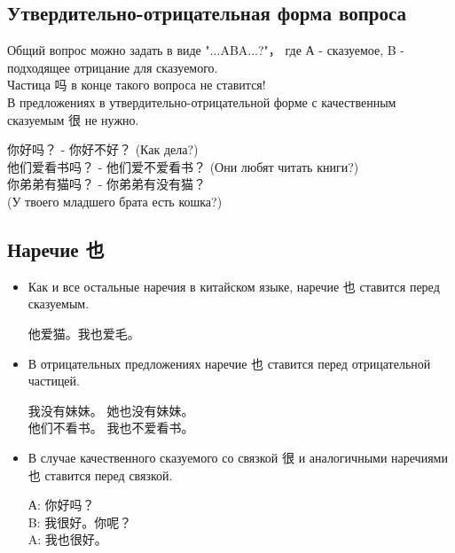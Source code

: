 \subsection{Утвердительно-отрицательная форма вопроса}
Общий вопрос можно задать в виде "...ABA...?"， где А - сказуемое, B - подходящее отрицание для сказуемого.\\
Частица 吗 в конце такого вопроса не ставится!\\
В предложениях в утвердительно-отрицательной форме с качественным сказуемым 很 не нужно.
\begin{example}\hfill \break \LARGE
	你好吗？ - 你好不好？ (Как дела?)\\
	他们爱看书吗？ - 他们爱不爱看书？ (Они любят читать книги?)\\
	你弟弟有猫吗？ - 你弟弟有没有猫？ \\
	(У твоего младшего брата есть кошка?)
\end{example}


\subsection{Наречие 也}
\begin{itemize}
	\item Как и все остальные наречия в китайском
	языке, наречие 也 ставится перед сказуемым.
	\begin{example}\hfill \break \LARGE
		他爱猫。我也爱毛。
	\end{example}
	\item В отрицательных предложениях наречие 也
	ставится перед отрицательной частицей. 
	\begin{example}\hfill \break \LARGE
		我没有妹妹。 她也没有妹妹。\\
		他们不看书。 我也不爱看书。
	\end{example}
	\item В случае качественного сказуемого со связкой 很 и аналогичными наречиями 也 ставится перед связкой. 
	\begin{example}\hfill \break \LARGE
		А: 你好吗？\\
		B: 我很好。你呢？\\
		A: 我也很好。
	\end{example}
\end{itemize}


